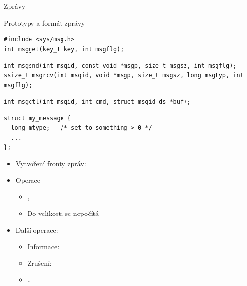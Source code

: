 \begin{frame}[fragile]{Zprávy}

  \begin{block}{Prototypy a formát zprávy}
    \begin{lstlisting}[aboveskip=2pt,belowskip=0pt]
#include <sys/msg.h>
int msgget(key_t key, int msgflg);
    \end{lstlisting}
    \begin{lstlisting}[aboveskip=0pt,belowskip=0pt]
int msgsnd(int msqid, const void *msgp, size_t msgsz, int msgflg);
ssize_t msgrcv(int msqid, void *msgp, size_t msgsz, long msgtyp, int msgflg);
    \end{lstlisting}
    \begin{lstlisting}[aboveskip=0pt,belowskip=0pt]
int msgctl(int msqid, int cmd, struct msqid_ds *buf);
    \end{lstlisting}
    \begin{lstlisting}[aboveskip=0pt,belowskip=2pt]
struct my_message {
  long mtype;   /* set to something > 0 */
  ...
};
    \end{lstlisting}
  \end{block}


  \begin{itemize}
    \item Vytvoření fronty zpráv: 

    \pause

    \item Operace
    \begin{itemize}
      \item {}, 
      \item Do velikosti se nepočítá 
    \end{itemize}

    \pause

    \item Další operace: 
    \begin{itemize}
      \item Informace: 
      \item Zrušení: 
      \item \dots
    \end{itemize}
  \end{itemize}

\end{frame}

